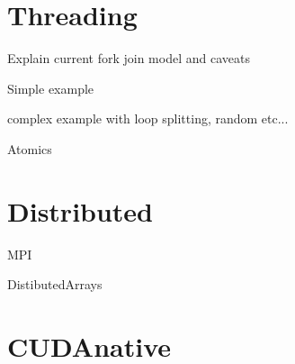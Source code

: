 \documentclass{beamer}
\begin{document}
\section{Threading}
\begin{frame}
  Explain current fork join model and caveats
\end{frame}
\begin{frame}
  Simple example
\end{frame}
\begin{frame}
  complex example with loop splitting, random etc...
\end{frame}
\begin{frame}
  Atomics
\end{frame}
\section{Distributed}
\begin{frame}
  MPI
\end{frame}
\begin{frame}
  DistibutedArrays
\end{frame}
\section{CUDAnative}
\end{document}
